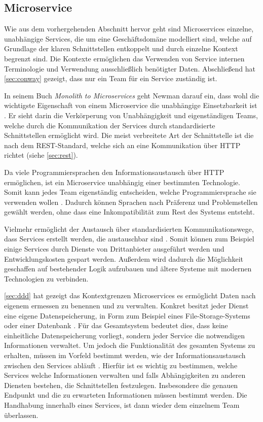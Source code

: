 \subsection{Microservice}

Wie aus dem vorhergehenden Abschnitt hervor geht sind Microservices einzelne, unabhängige Services, die um eine Geschäftsdomäne modelliert sind, welche auf Grundlage der klaren Schnittstellen entkoppelt und durch einzelne Kontext begrenzt sind. Die Kontexte ermöglichen das Verwenden von Service internen Terminologie und Verwendung ausschließlich benötigter Daten. Abschließend hat \cref{sec:conway} gezeigt, dass nur ein Team für ein Service zuständig ist.

In seinem Buch \textit{Monolith to Microservices} geht Newman darauf ein, dass wohl die wichtigste Eigenschaft von einem Microservice die unabhängige Einsetzbarkeit ist \parencite[vgl.][Kap. 2.1.1]{newman_monolith_2019}. Er sieht darin die Verkörperung von Unabhängigkeit und eigenständigen Teams, welche durch die Kommunikation der Services durch standardisierte Schnittstellen ermöglicht wird. Die meist verbreitete Art der Schnittstelle ist die nach dem REST-Standard, welche sich an eine Kommunikation über HTTP richtet (siehe \cref{sec:rest}).
 
Da viele Programmiersprachen den Informationsaustausch über HTTP ermöglichen, ist ein Microservice unabhängig einer bestimmten Technologie. Somit kann jedes Team eigenständig entscheiden, welche Programmiersprache sie verwenden wollen \parencite[vgl.][Kap. 1.2]{wolff_microservices_2018}. Dadurch können Sprachen nach Präferenz und Problemstellen gewählt werden, ohne dass eine Inkompatibilität zum Rest des Systems entsteht.

Vielmehr ermöglicht der Austausch über standardisierten Kommunikationswege, dass Services erstellt werden, die austauschbar sind \parencite[vgl.][Kap. 1.2]{wolff_microservices_2018}. Somit können zum Beispiel einige Services durch Dienste von Drittanbieter ausgeführt werden und Entwicklungskosten gespart werden. Außerdem wird dadurch die Möglichkeit geschaffen auf bestehender Logik aufzubauen und ältere Systeme mit modernen Technologien zu verbinden.

\cref{sec:ddd} hat gezeigt das Kontextgrenzen Microservices es ermöglicht Daten nach eigenem ermessen zu benennen und zu verwalten. Konkret besitzt jeder Dienst eine eigene Datenspeicherung, in Form zum Beispiel eines File-Storage-Systems oder einer Datenbank \parencite[vgl.][Kap. 2.1.3]{newman_monolith_2019}. Für das Gesamtsystem bedeutet dies, dass keine einheitliche Datenspeicherung vorliegt, sondern jeder Service die notwendigen Informationen verwaltet. Um jedoch die Funktionalität des gesamten Systems zu erhalten, müssen im Vorfeld bestimmt werden, wie der Informationsaustausch zwischen den Services abläuft \parencite[vgl.][Kap. 4.1]{wolff_microservices_2018}. Hierfür ist es wichtig zu bestimmen, welche Services welche Informationen verwalten und falls Abhängigkeiten zu anderen Diensten bestehen, die Schnittstellen festzulegen. Insbesondere die genauen Endpunkt und die zu erwarteten Informationen müssen bestimmt werden. Die Handhabung innerhalb eines Services, ist dann wieder dem einzelnem Team überlassen. 

